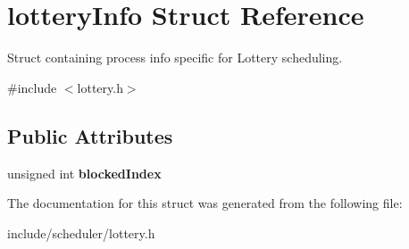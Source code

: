 \hypertarget{structlotteryInfo}{\section{lottery\-Info \-Struct \-Reference}
\label{de/d4c/structlotteryInfo}
}


\-Struct containing process info specific for \-Lottery scheduling.  




{\ttfamily \#include $<$lottery.\-h$>$}

\subsection*{\-Public \-Attributes}
\begin{DoxyCompactItemize}
\item 
\hypertarget{structlotteryInfo_aec8e9dc093af752c056563e24275a63b}{unsigned int {\bfseries blocked\-Index}}\label{de/d4c/structlotteryInfo_aec8e9dc093af752c056563e24275a63b}

\end{DoxyCompactItemize}


\-The documentation for this struct was generated from the following file\-:\begin{DoxyCompactItemize}
\item 
include/scheduler/lottery.\-h\end{DoxyCompactItemize}
